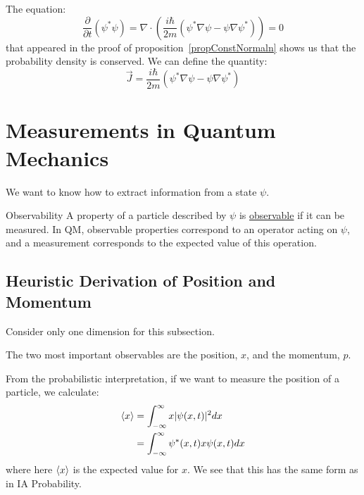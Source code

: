 \documentclass[../Main.tex]{subfiles}
\begin{document}
\begin{remark}
    The equation:
    \begin{equation*}
        \frac{\partial}{\partial t} (\psi^* \psi) = \nabla \cdot \left(\frac{i\hbar}{2m}(\psi^* \nabla \psi - \psi \nabla \psi^*)\right) = 0
    \end{equation*}
    that appeared in the proof of proposition~\ref{propConstNormaln} shows us that the probability density is conserved. We can define the quantity:
    \begin{equation*}
        \vec{J} = \frac{i\hbar}{2m}(\psi^* \nabla \psi - \psi \nabla \psi^*)
    \end{equation*}
\end{remark}
\section{Measurements in Quantum Mechanics}
We want to know how to extract information from a state $\psi$.
\begin{definition}{Observability}
    A property of a particle described by $\psi$ is \underline{observable} if it can be measured. In QM, observable properties correspond to an operator acting on $\psi$, and a measurement corresponds to the expected value of this operation.
\end{definition}
\subsection{Heuristic Derivation of Position and Momentum}
Consider only one dimension for this subsection.

The two most important observables are the position, $x$, and the momentum, $p$.

From the probabilistic interpretation, if we want to measure the position of a particle, we calculate:
\begin{align*}
    \langle x \rangle &= \int_{-\infty}^{\infty} x |\psi(x, t)|^2 dx \\
    &= \int_{-\infty}^\infty \psi^*(x, t) x \psi(x, t) dx
\end{align*}
where here $\langle x \rangle$ is the expected value for $x$. We see that this has the same form as in IA Probability.
\end{document}
